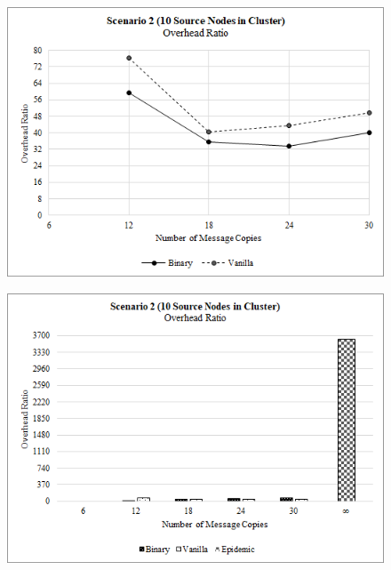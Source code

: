 \documentclass{article}
\begin{document}
\begin{figure}[h!]
\centering
\begin{minipage}[t]{.5\textwidth}
  \centering
  \includegraphics[width=.98\linewidth]{Results/Graphs/OverheadRatio/S2_OverheadRatio_SprayAndWaitComparison.png}
  \label{fig:test1}
\end{minipage}%
\begin{minipage}[t]{.5\textwidth}
  \centering
  \includegraphics[width=.98\linewidth]{Results/Graphs/OverheadRatio/S2_OverheadRatio_AllComparison.png}
  \label{fig:test2}
\end{minipage}


\end{figure}
\end{document}
